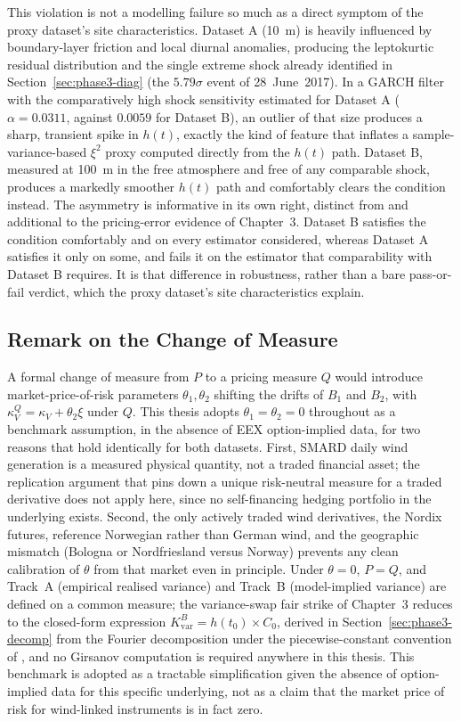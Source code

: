 This violation is not a modelling failure so much as a direct symptom of the proxy dataset's site characteristics. Dataset A (10~m) is heavily influenced by boundary-layer friction and local diurnal anomalies, producing the leptokurtic residual distribution and the single extreme shock already identified in Section~\ref{sec:phase3-diag} (the $5.79\sigma$ event of 28~June~2017). In a GARCH filter with the comparatively high shock sensitivity estimated for Dataset A ($\alpha = 0.0311$, against $0.0059$ for Dataset B), an outlier of that size produces a sharp, transient spike in $h(t)$, exactly the kind of feature that inflates a sample-variance-based $\xi^2$ proxy computed directly from the $h(t)$ path. Dataset B, measured at 100~m in the free atmosphere and free of any comparable shock, produces a markedly smoother $h(t)$ path and comfortably clears the condition instead. The asymmetry is informative in its own right, distinct from and additional to the pricing-error evidence of Chapter~3. Dataset B satisfies the condition comfortably and on every estimator considered, whereas Dataset A satisfies it only on some, and fails it on the estimator that comparability with Dataset B requires. It is that difference in robustness, rather than a bare pass-or-fail verdict, which the proxy dataset's site characteristics explain.

\subsection{Remark on the Change of Measure}
\label{sec:phase5-measure}

A formal change of measure from $P$ to a pricing measure $Q$ would introduce market-price-of-risk parameters $\theta_1, \theta_2$ shifting the drifts of $B_1$ and $B_2$, with $\kappa_V^Q = \kappa_V + \theta_2\xi$ under $Q$. This thesis adopts $\theta_1 = \theta_2 = 0$ throughout as a benchmark assumption, in the absence of EEX option-implied data, for two reasons that hold identically for both datasets. First, SMARD daily wind generation is a measured physical quantity, not a traded financial asset; the replication argument that pins down a unique risk-neutral measure for a traded derivative does not apply here, since no self-financing hedging portfolio in the underlying exists. Second, the only actively traded wind derivatives, the Nordix futures, reference Norwegian rather than German wind, and the geographic mismatch (Bologna or Nordfriesland versus Norway) prevents any clean calibration of $\theta$ from that market even in principle. Under $\theta = 0$, $P = Q$, and Track~A (empirical realised variance) and Track~B (model-implied variance) are defined on a common measure; the variance-swap fair strike of Chapter~3 reduces to the closed-form expression $K_{\text{var}}^B = h(t_0) \times C_0$, derived in Section~\ref{sec:phase3-decomp} from the Fourier decomposition under the piecewise-constant convention of \citet{Tol1997}, and no Girsanov computation is required anywhere in this thesis. This benchmark is adopted as a tractable simplification given the absence of option-implied data for this specific underlying, not as a claim that the market price of risk for wind-linked instruments is in fact zero.

